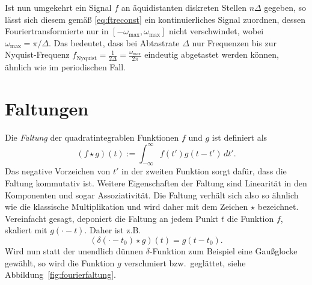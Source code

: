 Ist nun umgekehrt ein Signal $f$ an äquidistanten diskreten Stellen
$n\Delta$ gegeben, so lässt sich diesem gemäß \eqref{eq:ftreconst} ein
kontinuierliches Signal zuordnen, dessen Fouriertransformierte nur in
$[-\omega_\text{max},\omega_\text{max}]$ nicht verschwindet, wobei $\omega_\text{max} =
\pi/\Delta$. Das bedeutet, dass bei Abtastrate $\Delta$ nur Frequenzen
bis zur Nyquist-Frequenz $f_\text{Nyquist}=\frac{1}{2\Delta} =
\frac{\omega_\text{max}}{2\pi}$ eindeutig abgetastet werden können, ähnlich wie
im periodischen Fall.

\section{Faltungen}

Die \emph{Faltung} der quadratintegrablen Funktionen $f$ und $g$ ist
definiert als
\begin{equation}
  (f \star g)(t) := \int_{-\infty}^{\infty} f(t')g(t-t')\,dt'.
\end{equation}
Das negative Vorzeichen von $t'$ in der zweiten Funktion sorgt
dafür, dass die Faltung kommutativ ist. Weitere Eigenschaften der
Faltung sind Linearität in den Komponenten und sogar
Assoziativität. Die Faltung verhält sich also so ähnlich wie die
klassische Multiplikation und wird daher mit dem Zeichen $\star$
bezeichnet.  Vereinfacht gesagt, deponiert die Faltung an jedem Punkt
$t$ die Funktion $f$, skaliert mit $g(\cdot - t) $. Daher ist z.B.
\begin{equation}
  (\delta(\cdot - t_0) \star g)(t) = g(t - t_0).
\end{equation}
Wird nun statt der unendlich dünnen $\delta$-Funktion zum Beispiel
eine Gaußglocke gewählt, so wird die Funktion $g$ verschmiert
bzw.\ geglättet, siehe Abbildung~\ref{fig:fourierfaltung}.

